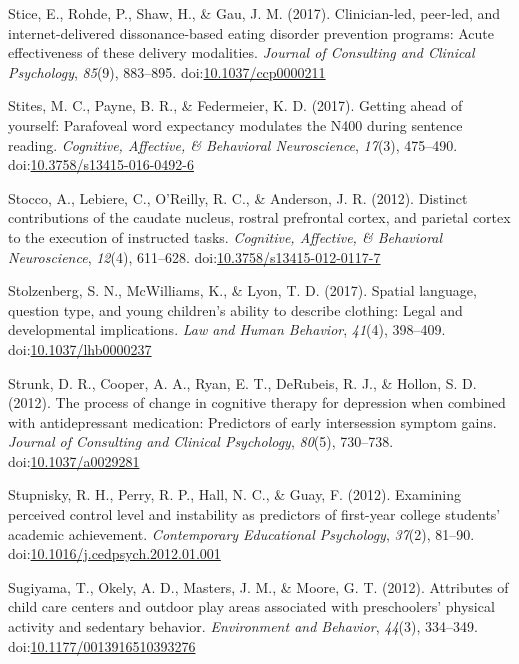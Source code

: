 \documentclass[english,man]{apa6}
\theoremstyle{definition}
\theoremstyle{definition}
\theoremstyle{definition}
\theoremstyle{remark}
\begin{document}
\hypertarget{ref-Stice2017a}{}
Stice, E., Rohde, P., Shaw, H., \& Gau, J. M. (2017). Clinician-led,
peer-led, and internet-delivered dissonance-based eating disorder
prevention programs: Acute effectiveness of these delivery modalities.
\emph{Journal of Consulting and Clinical Psychology}, \emph{85}(9),
883--895.
doi:\href{https://doi.org/10.1037/ccp0000211}{10.1037/ccp0000211}

\hypertarget{ref-Stites2017}{}
Stites, M. C., Payne, B. R., \& Federmeier, K. D. (2017). Getting ahead
of yourself: Parafoveal word expectancy modulates the N400 during
sentence reading. \emph{Cognitive, Affective, \& Behavioral
Neuroscience}, \emph{17}(3), 475--490.
doi:\href{https://doi.org/10.3758/s13415-016-0492-6}{10.3758/s13415-016-0492-6}

\hypertarget{ref-Stocco2012}{}
Stocco, A., Lebiere, C., O'Reilly, R. C., \& Anderson, J. R. (2012).
Distinct contributions of the caudate nucleus, rostral prefrontal
cortex, and parietal cortex to the execution of instructed tasks.
\emph{Cognitive, Affective, \& Behavioral Neuroscience}, \emph{12}(4),
611--628.
doi:\href{https://doi.org/10.3758/s13415-012-0117-7}{10.3758/s13415-012-0117-7}

\hypertarget{ref-Stolzenberg2017}{}
Stolzenberg, S. N., McWilliams, K., \& Lyon, T. D. (2017). Spatial
language, question type, and young children's ability to describe
clothing: Legal and developmental implications. \emph{Law and Human
Behavior}, \emph{41}(4), 398--409.
doi:\href{https://doi.org/10.1037/lhb0000237}{10.1037/lhb0000237}

\hypertarget{ref-Strunk2012}{}
Strunk, D. R., Cooper, A. A., Ryan, E. T., DeRubeis, R. J., \& Hollon,
S. D. (2012). The process of change in cognitive therapy for depression
when combined with antidepressant medication: Predictors of early
intersession symptom gains. \emph{Journal of Consulting and Clinical
Psychology}, \emph{80}(5), 730--738.
doi:\href{https://doi.org/10.1037/a0029281}{10.1037/a0029281}

\hypertarget{ref-Stupnisky2012}{}
Stupnisky, R. H., Perry, R. P., Hall, N. C., \& Guay, F. (2012).
Examining perceived control level and instability as predictors of
first-year college students' academic achievement. \emph{Contemporary
Educational Psychology}, \emph{37}(2), 81--90.
doi:\href{https://doi.org/10.1016/j.cedpsych.2012.01.001}{10.1016/j.cedpsych.2012.01.001}

\hypertarget{ref-Sugiyama2012}{}
Sugiyama, T., Okely, A. D., Masters, J. M., \& Moore, G. T. (2012).
Attributes of child care centers and outdoor play areas associated with
preschoolers' physical activity and sedentary behavior.
\emph{Environment and Behavior}, \emph{44}(3), 334--349.
doi:\href{https://doi.org/10.1177/0013916510393276}{10.1177/0013916510393276}
\end{document}
